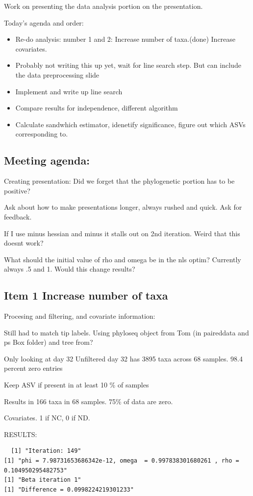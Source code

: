 \documentclass[10pt]{article}
\theoremstyle{definition}
\begin{document}
Work on presenting the data analysis portion on the presentation.

Today's agenda and order:
\begin{itemize}
  \item Re-do analysis: number 1 and 2: Increase number of taxa.(done) Increase covariates.
  \item Probably not writing this up yet, wait for line search step. But can include the data preprocessing slide
  \item Implement and write up line search
  \item Compare results for independence, different algorithm
  \item Calculate sandwhich estimator, idenetify significance, figure out which ASVs corresponding to.
\end{itemize}


\subsection{Meeting agenda:}
Creating presentation: Did we forget that the phylogenetic portion has to be positive?

Ask about how to make presentations longer, always rushed and quick. Ask for feedback.

If I use minus hessian and minus it stalls out on 2nd iteration. Weird that this doesnt work?

What should the initial value of rho and omega be in the nls optim? Currently always .5 and 1. Would this change results?

\subsection{ Item 1 Increase number of taxa}
Procesing and filtering, and covariate information:


Still had to match tip labels. Using phyloseq object from Tom (in paireddata and ps Box folder) and tree from?

Only looking at day 32
Unfiltered day 32 has 3895 taxa across 68 samples. 98.4 percent zero entries

Keep ASV if present in at least 10 \% of samples

Results in 166 taxa in 68 samples. 75\% of data are zero.

Covariates. 1 if NC, 0 if ND.

RESULTS:

\begin{verbatim}
  [1] "Iteration: 149"
[1] "phi = 7.98731653686342e-12, omega  = 0.997838301680261 , rho = 0.104950295482753"
[1] "Beta iteration 1"
[1] "Difference = 0.0998224219301233"
\end{verbatim}
\end{document}
